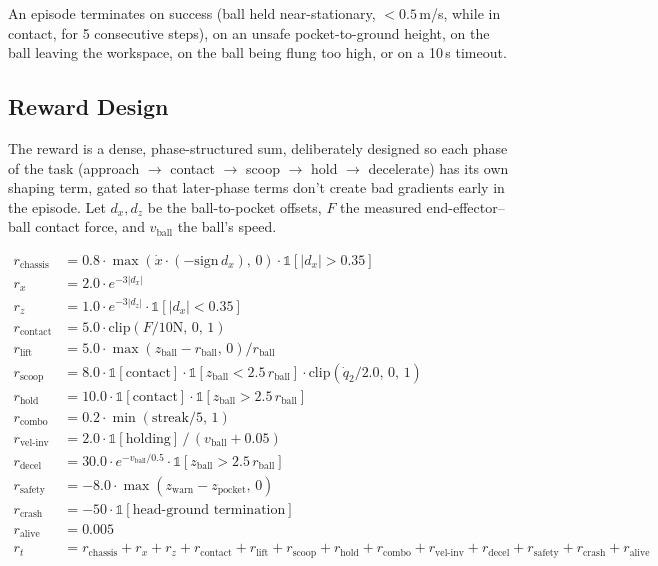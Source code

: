 \documentclass[11pt]{article}
\begin{document}
An episode terminates on success (ball held near-stationary, $< 0.5$\,m/s,
while in contact, for 5 consecutive steps), on an unsafe pocket-to-ground
height, on the ball leaving the workspace, on the ball being flung too high,
or on a 10\,s timeout.

\subsection{Reward Design}
\label{sec:reward}

The reward is a dense, phase-structured sum, deliberately designed so each
phase of the task (approach $\to$ contact $\to$ scoop $\to$ hold $\to$
decelerate) has its own shaping term, gated so that later-phase terms don't
create bad gradients early in the episode. Let $d_x, d_z$ be the ball-to-pocket
offsets, $F$ the measured end-effector--ball contact force, and $v_{\text{ball}}$
the ball's speed.

\begin{align}
r_{\text{chassis}} &= 0.8 \cdot \max(\dot{x}\cdot(-\mathrm{sign}\,d_x),\,0)\cdot\mathbb{1}[|d_x| > 0.35] \\
r_{x} &= 2.0 \cdot e^{-3|d_x|} \\
r_{z} &= 1.0 \cdot e^{-3|d_z|}\cdot\mathbb{1}[|d_x| < 0.35] \\
r_{\text{contact}} &= 5.0 \cdot \mathrm{clip}(F / 10\text{N},\,0,\,1) \\
r_{\text{lift}} &= 5.0 \cdot \max(z_{\text{ball}} - r_{\text{ball}},\,0)/r_{\text{ball}} \\
r_{\text{scoop}} &= 8.0 \cdot \mathbb{1}[\text{contact}]\cdot\mathbb{1}[z_{\text{ball}} < 2.5\,r_{\text{ball}}]\cdot\mathrm{clip}(\dot{q}_2/2.0,\,0,\,1) \\
r_{\text{hold}} &= 10.0 \cdot \mathbb{1}[\text{contact}]\cdot\mathbb{1}[z_{\text{ball}} > 2.5\,r_{\text{ball}}] \\
r_{\text{combo}} &= 0.2 \cdot \min(\text{streak}/5,\,1) \\
r_{\text{vel-inv}} &= 2.0 \cdot \mathbb{1}[\text{holding}] \,/\, (v_{\text{ball}} + 0.05) \\
r_{\text{decel}} &= 30.0 \cdot e^{-v_{\text{ball}}/0.5}\cdot\mathbb{1}[z_{\text{ball}} > 2.5\,r_{\text{ball}}] \\
r_{\text{safety}} &= -8.0 \cdot \max(z_{\text{warn}} - z_{\text{pocket}},\,0) \\
r_{\text{crash}} &= -50 \cdot \mathbb{1}[\text{head-ground termination}] \\
r_{\text{alive}} &= 0.005 \\[4pt]
r_t &= r_{\text{chassis}} + r_x + r_z + r_{\text{contact}} + r_{\text{lift}} + r_{\text{scoop}}
       + r_{\text{hold}} + r_{\text{combo}} + r_{\text{vel-inv}} + r_{\text{decel}}
       + r_{\text{safety}} + r_{\text{crash}} + r_{\text{alive}}
\end{align}
\end{document}
